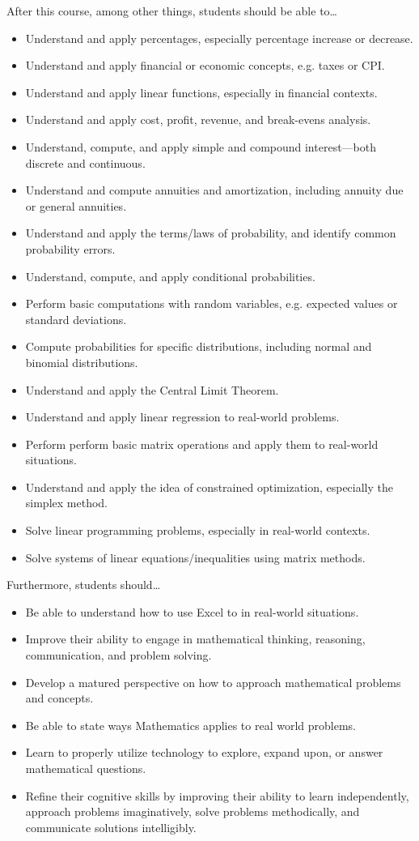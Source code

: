 \documentclass[11pt,letterpaper]{article}
\begin{document}
After this course, among other things, students should be able to\dots
	\begin{itemize} \itemsep=0.3ex
	\item Understand and apply percentages, especially percentage increase or decrease. 
	\item Understand and apply financial or economic concepts, e.g. taxes or CPI.
	\item Understand and apply linear functions, especially in financial contexts. 
	\item Understand and apply cost, profit, revenue, and break-evens analysis.
	\item Understand, compute, and apply simple and compound interest---both discrete and continuous. 
	\item Understand and compute annuities and amortization, including annuity due or general annuities. 	
	\item Understand and apply the terms/laws of probability, and identify common probability errors. 
	\item Understand, compute, and apply conditional probabilities. 
	\item Perform basic computations with random variables, e.g. expected values or standard deviations. 
	\item Compute probabilities for specific distributions, including normal and binomial distributions. 
	\item Understand and apply the Central Limit Theorem. 
	\item Understand and apply linear regression to real-world problems.
	\item Perform perform basic matrix operations and apply them to real-world situations.
	\item Understand and apply the idea of constrained optimization, especially the simplex method.
	\item Solve linear programming problems, especially in real-world contexts. 
	\item Solve systems of linear equations/inequalities using matrix methods.
	\end{itemize}
Furthermore, students should\dots
	\begin{itemize} \itemsep=0.3ex
	\item Be able to understand how to use Excel to in real-world situations. 
	\item  Improve their ability to engage in mathematical thinking, reasoning, communication, and problem solving.
	\item Develop a matured perspective on how to approach mathematical problems and concepts.
	\item Be able to state ways Mathematics applies to real world problems.
	\item Learn to properly utilize technology to explore, expand upon, or answer mathematical questions.
	\item Refine their cognitive skills by improving their ability to learn independently, approach problems imaginatively, solve problems methodically, and communicate solutions intelligibly.
	\end{itemize}
\end{document}
